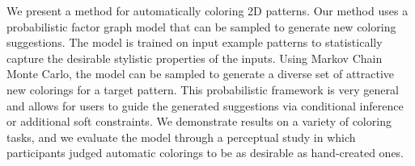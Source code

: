We present a method for automatically coloring 2D patterns. Our method uses a probabilistic factor graph model that can be sampled to generate new coloring suggestions. The model is trained on input example patterns to statistically capture the desirable stylistic properties of the inputs. Using Markov Chain Monte Carlo, the model can be sampled to generate a diverse set of attractive new colorings for a target pattern. This probabilistic framework is very general and allows for users to guide the generated suggestions via conditional inference or additional soft constraints. We demonstrate results on a variety of coloring tasks, and we evaluate the model through a perceptual study in which participants judged automatic colorings to be as desirable as hand-created ones.